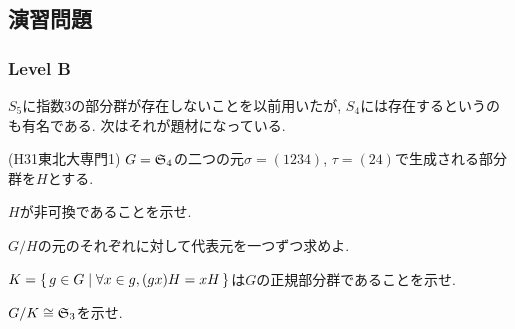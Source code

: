 \subsection{演習問題}
\subsubsection{Level B}

$S_5$に指数3の部分群が存在しないことを以前用いたが,  $S_4$には存在するというのも有名である. 次はそれが題材になっている.

\begin{prob} (H31東北大専門1)
$G=\mathfrak{S}_{4}$の二つの元$\sigma = (1234)$, $\tau = (24)$で生成される部分群を$H$とする.
\ben
\item $H$が非可換であることを示せ.
\item $G/H$の元のそれぞれに対して代表元を一つずつ求めよ.
\item $K=\set{g\in G\mid \forall x\in g, (gx)H = xH}$は$G$の正規部分群であることを示せ.
\item $G/K\cong \mathfrak{S}_{3}$を示せ.
\een
\end{prob}

